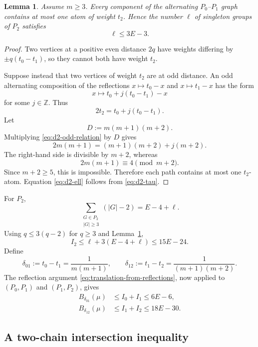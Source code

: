 \documentclass[11pt]{article}
\newtheorem{lemma}[theorem]{Lemma}
\theoremstyle{definition}
\newcommand{\Z}{\mathbb{Z}}
\newcommand{\1}{\mathbf{1}}
\begin{document}
\begin{lemma}\label{lem:d2-one-singleton}
Assume $m\ge3$.  Every component of the alternating $P_0$--$P_1$ graph contains at most one atom of weight $t_2$.  Hence the number $\ell$ of singleton groups of $P_2$ satisfies
\begin{equation}\label{eq:d2-ell}
  \ell\le3E-3.
\end{equation}
\end{lemma}

\begin{proof}
Two vertices at a positive even distance $2q$ have weights differing by $\pm q(t_0-t_1)$, so they cannot both have weight $t_2$.

Suppose instead that two vertices of weight $t_2$ are at odd distance.  An odd alternating composition of the reflections $x\mapsto t_0-x$ and $x\mapsto t_1-x$ has the form
\[
  x\longmapsto t_0+j(t_0-t_1)-x
\]
for some $j\in\Z$.  Thus
\begin{equation}\label{eq:d2-odd-relation}
  2t_2=t_0+j(t_0-t_1).
\end{equation}
Let
\[
  D:=m(m+1)(m+2).
\]
Multiplying \eqref{eq:d2-odd-relation} by $D$ gives
\[
  2m(m+1)=(m+1)(m+2)+j(m+2).
\]
The right-hand side is divisible by $m+2$, whereas
\[
  2m(m+1)\equiv4\pmod{m+2}.
\]
Since $m+2\ge5$, this is impossible.  Therefore each path contains at most one $t_2$-atom.  Equation \eqref{eq:d2-ell} follows from \eqref{eq:d2-tau}.
\end{proof}

For $P_2$,
\[
  \sum_{\substack{G\in P_2\\|G|\ge3}}(|G|-2)=E-4+\ell.
\]
Using $q\le3(q-2)$ for $q\ge3$ and Lemma~\ref{lem:d2-one-singleton},
\begin{equation}\label{eq:d2-I2}
  I_2
  \le\ell+3(E-4+\ell)
  \le15E-24.
\end{equation}
Define
\begin{equation}\label{eq:d2-deltas}
  \delta_{01}:=t_0-t_1=\frac1{m(m+1)},
  \qquad
  \delta_{12}:=t_1-t_2=\frac1{(m+1)(m+2)}.
\end{equation}
The reflection argument \eqref{eq:translation-from-reflections}, now applied to $(P_0,P_1)$ and $(P_1,P_2)$, gives
\begin{align}
  B_{\delta_{01}}(\mu)&\le I_0+I_1\le6E-6,\label{eq:d2-B01}\\
  B_{\delta_{12}}(\mu)&\le I_1+I_2\le18E-30.\label{eq:d2-B12}
\end{align}

\subsection{A two-chain intersection inequality}
\end{document}
